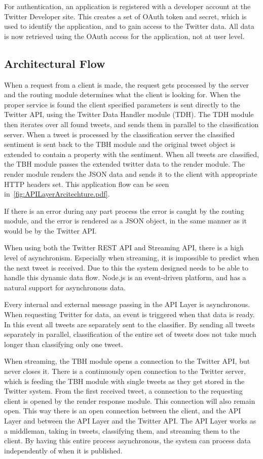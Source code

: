 For authentication, an application is registered with a developer account at the Twitter Developer site. This creates a set of OAuth token and secret, which is used to identify the application, and to gain access to the Twitter data. All data is now retrieved using the OAuth access for the application, not at user level. 

\subsection{Architectural Flow}
When a request from a client is made, the request gets processed by the server and the routing module determines what the client is looking for. When the proper service is found the client specified parameters is sent directly to the Twitter API, using the Twitter Data Handler module (TDH). The TDH module then iterates over all found tweets, and sends them in parallel to the classification server. When a tweet is processed by the classification server the classified sentiment is sent back to the TBH module and the original tweet object is extended to contain a property with the sentiment. When all tweets are classified, the TBH module passes the extended twitter data to the render module. The render module renders the JSON data and sends it to the client with appropriate HTTP headers set. This application flow can be seen in~\autoref{fig:APILayerArcitechture.pdf}.

If there is an error during any part process the error is caught by the routing module, and the error is rendered as a JSON object, in the same manner as it would be by the Twitter API. 

When using both the Twitter REST API and Streaming API, there is a high level of asynchronism. Especially when streaming, it is impossible to predict when the next tweet is received. Due to this the system designed needs to be able to handle this dynamic data flow. Node.js is an event-driven platform, and has a natural support for asynchronous data. 

Every internal and external message passing in the API Layer is asynchronous. When requesting Twitter for data, an event is triggered when that data is ready. In this event all tweets are separately sent to the classifier. By sending all tweets separately in parallel, classification of the entire set of tweets does not take much longer than classifying only one tweet. 

When streaming, the TBH module opens a connection to the Twitter API, but never closes it. There is a continuously open connection to the Twitter server, which is feeding the TBH module with single tweets as they get stored in the Twitter system. From the first received tweet, a connection to the requesting client is opened by the render response module. This connection will also remain open. This way there is an open connection between the client, and the API Layer and between the API Layer and the Twitter API. The API Layer works as a middleman, taking in tweets, classifying them, and streaming them to the client. By having this entire process asynchronous, the system can process data independently of when it is published.


